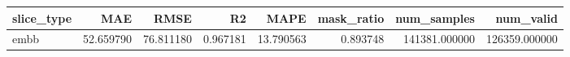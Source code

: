 \begin{tabular}{lrrrrrrr}
\toprule
slice_type & MAE & RMSE & R2 & MAPE & mask_ratio & num_samples & num_valid \\
\midrule
embb & 52.659790 & 76.811180 & 0.967181 & 13.790563 & 0.893748 & 141381.000000 & 126359.000000 \\
\bottomrule
\end{tabular}
